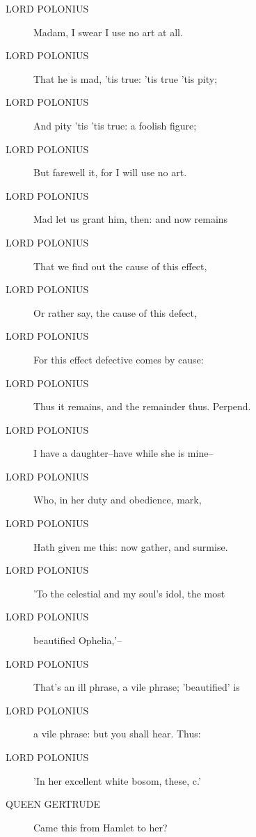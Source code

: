 \documentclass{article}
\begin{document}
\begin{description}
            
\item[LORD POLONIUS] Madam, I swear I use no art at all.
\item[LORD POLONIUS] That he is mad, 'tis true: 'tis true 'tis pity;
\item[LORD POLONIUS] And pity 'tis 'tis true: a foolish figure;
\item[LORD POLONIUS] But farewell it, for I will use no art.
\item[LORD POLONIUS] Mad let us grant him, then: and now remains
\item[LORD POLONIUS] That we find out the cause of this effect,
\item[LORD POLONIUS] Or rather say, the cause of this defect,
\item[LORD POLONIUS] For this effect defective comes by cause:
\item[LORD POLONIUS] Thus it remains, and the remainder thus. Perpend.
\item[LORD POLONIUS] I have a daughter--have while she is mine--
\item[LORD POLONIUS] Who, in her duty and obedience, mark,
\item[LORD POLONIUS] Hath given me this: now gather, and surmise.
\item[LORD POLONIUS] 'To the celestial and my soul's idol, the most
\item[LORD POLONIUS] beautified Ophelia,'--
\item[LORD POLONIUS] That's an ill phrase, a vile phrase; 'beautified' is
\item[LORD POLONIUS] a vile phrase: but you shall hear. Thus:
\item[LORD POLONIUS] 'In her excellent white bosom, these, c.'
\end{description}
          
\begin{description}
            
\item[QUEEN GERTRUDE] Came this from Hamlet to her?
\end{description}
          
\end{document}
